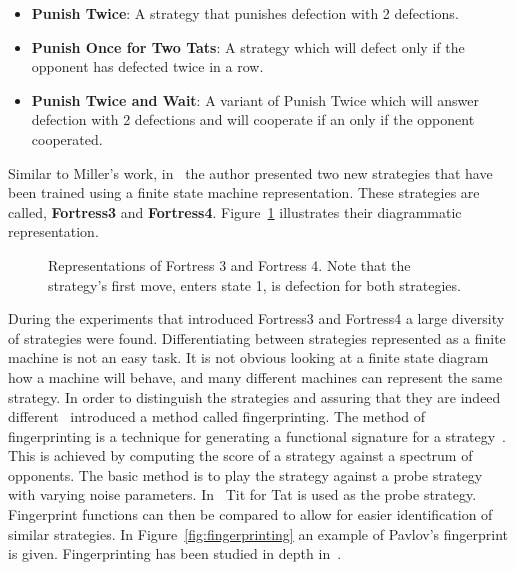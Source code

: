 \documentclass{article}
\theoremstyle{definition}
\begin{document}
\begin{itemize}
    \item \textbf{Punish Twice}: A strategy that punishes defection with 2 defections.
    \item \textbf{Punish Once for Two Tats}: A strategy which will defect only if the
    opponent has defected twice in a row.
    \item \textbf{Punish Twice and Wait}: A variant of Punish Twice which will
    answer defection with 2 defections and will cooperate if an only if the opponent
    cooperated.
\end{itemize}


Similar to Miller's work, in~\cite{Ashlock2006b} the author presented two new
strategies that have been trained using a finite state machine representation.
These strategies are called,
\textbf{Fortress3} and \textbf{Fortress4}. Figure~\ref{fig:fortress3_and_4}
illustrates their diagrammatic representation.

\begin{figure}[!hbtp]
\centering
    \begin{subfigure}{.4\textwidth}
        
    \end{subfigure}
    \begin{subfigure}{.4\textwidth}\centering
        
     \end{subfigure}
     \caption{Representations of Fortress 3 and Fortress 4. Note that the
     strategy's first move, enters state 1, is defection for both strategies.}
     \label{fig:fortress3_and_4}
\end{figure}

During the experiments that introduced Fortress3 and Fortress4 a large diversity
of strategies were found. Differentiating between strategies represented as 
a finite machine is not an easy task.  It is not obvious looking at a finite
state diagram how a machine will behave, and many different machines can represent
the same strategy.
In order to distinguish
the strategies and assuring that they are indeed different~\cite{Ashlock2005}
introduced a method called fingerprinting.
The method of fingerprinting is a technique for generating a functional signature for a
strategy~\cite{Ashlock2008}. This is achieved by computing the score of a strategy
against a spectrum of opponents. The basic method is to play the strategy
against a probe strategy with varying noise parameters. In~\cite{Ashlock2005}
Tit for Tat is used as the probe strategy. Fingerprint functions
can then be compared to allow for easier identification of similar strategies.
In Figure~\ref{fig:fingerprinting} an example of Pavlov's fingerprint is given.
Fingerprinting has been studied in depth in~\cite{Ashlock2008, Ashlock2009,
Ashlock2010, Ashlock2006a}.
\end{document}
